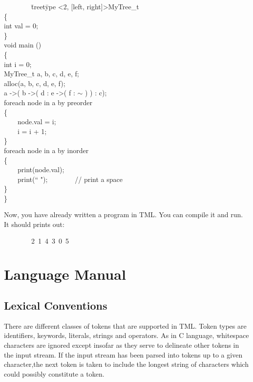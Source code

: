 \documentclass[12pt,psfig,a4]{article}
\begin{document}
\begin{code}
\begin{tabbing}
~~~~~~~~\= treet\=ype \textless2, [left, right]\textgreater MyTree\_t \\
\> \{ \\
\> \>int val = 0;\\
\> \}\\
\>  void main () \\
\> \{ \\
\> \> int i = 0;\\
\> \> MyTree\_t a, b, c, d, e, f;\\
\> \> alloc(a, b, c, d, e, f);\\
\> \> a -\textgreater ( b -\textgreater ( d : e -\textgreater ( f : $\sim$ ) ) : c);\\
\> \> foreach node in a by preorder\\
\> \> \{\\
\> \> ~~~~node.val = i;\\
\> \> ~~~~i = i + 1;\\
\> \> \}\\
\> \> foreach node in a by inorder\\
\> \> \{\\
\> \> ~~~~print(node.val);\\
\> \> ~~~~print(`` ");~~~~~~~~// print a space\\
\> \> \}\\
\> \}
\end{tabbing}
\end{code}

Now, you have already written a program in TML. You can compile it and run. It should prints out:
\begin{code}
\begin{tabbing}
~~~~~~~~2~1~4~3~0~5\\
\end{tabbing}
\end{code}


\pagebreak
\section{Language Manual}

\subsection{Lexical Conventions} \label{lexCon}
There are different classes of tokens that are supported in TML. Token types are identifiers, keywords, literals, strings and operators. As in C language, whitespace characters are ignored except insofar as they serve to delineate other tokens in the input stream. If the input stream has been parsed into tokens up to a given character,the next token is taken to include the longest string of characters which could possibly constitute a token.
\end{document}
